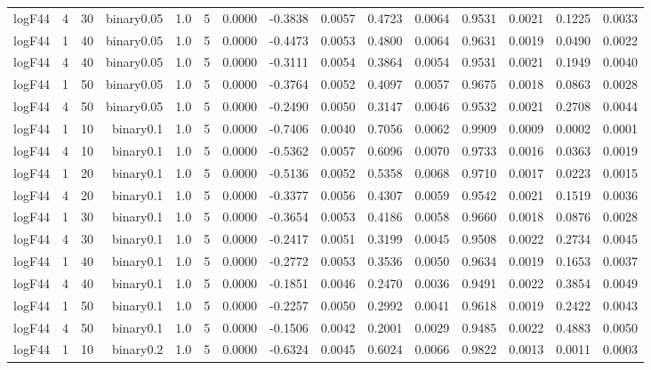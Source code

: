 \begin{longtable}{rrrrrrrrrrrrrrr}
  logF44 & 4 & 30 & binary0.05 & 1.0 & 5 & 0.0000 & -0.3838 & 0.0057 & 0.4723 & 0.0064 & 0.9531 & 0.0021 & 0.1225 & 0.0033 \\ 
  logF44 & 1 & 40 & binary0.05 & 1.0 & 5 & 0.0000 & -0.4473 & 0.0053 & 0.4800 & 0.0064 & 0.9631 & 0.0019 & 0.0490 & 0.0022 \\ 
  logF44 & 4 & 40 & binary0.05 & 1.0 & 5 & 0.0000 & -0.3111 & 0.0054 & 0.3864 & 0.0054 & 0.9531 & 0.0021 & 0.1949 & 0.0040 \\ 
  logF44 & 1 & 50 & binary0.05 & 1.0 & 5 & 0.0000 & -0.3764 & 0.0052 & 0.4097 & 0.0057 & 0.9675 & 0.0018 & 0.0863 & 0.0028 \\ 
  logF44 & 4 & 50 & binary0.05 & 1.0 & 5 & 0.0000 & -0.2490 & 0.0050 & 0.3147 & 0.0046 & 0.9532 & 0.0021 & 0.2708 & 0.0044 \\ 
  logF44 & 1 & 10 & binary0.1 & 1.0 & 5 & 0.0000 & -0.7406 & 0.0040 & 0.7056 & 0.0062 & 0.9909 & 0.0009 & 0.0002 & 0.0001 \\ 
  logF44 & 4 & 10 & binary0.1 & 1.0 & 5 & 0.0000 & -0.5362 & 0.0057 & 0.6096 & 0.0070 & 0.9733 & 0.0016 & 0.0363 & 0.0019 \\ 
  logF44 & 1 & 20 & binary0.1 & 1.0 & 5 & 0.0000 & -0.5136 & 0.0052 & 0.5358 & 0.0068 & 0.9710 & 0.0017 & 0.0223 & 0.0015 \\ 
  logF44 & 4 & 20 & binary0.1 & 1.0 & 5 & 0.0000 & -0.3377 & 0.0056 & 0.4307 & 0.0059 & 0.9542 & 0.0021 & 0.1519 & 0.0036 \\ 
  logF44 & 1 & 30 & binary0.1 & 1.0 & 5 & 0.0000 & -0.3654 & 0.0053 & 0.4186 & 0.0058 & 0.9660 & 0.0018 & 0.0876 & 0.0028 \\ 
  logF44 & 4 & 30 & binary0.1 & 1.0 & 5 & 0.0000 & -0.2417 & 0.0051 & 0.3199 & 0.0045 & 0.9508 & 0.0022 & 0.2734 & 0.0045 \\ 
  logF44 & 1 & 40 & binary0.1 & 1.0 & 5 & 0.0000 & -0.2772 & 0.0053 & 0.3536 & 0.0050 & 0.9634 & 0.0019 & 0.1653 & 0.0037 \\ 
  logF44 & 4 & 40 & binary0.1 & 1.0 & 5 & 0.0000 & -0.1851 & 0.0046 & 0.2470 & 0.0036 & 0.9491 & 0.0022 & 0.3854 & 0.0049 \\ 
  logF44 & 1 & 50 & binary0.1 & 1.0 & 5 & 0.0000 & -0.2257 & 0.0050 & 0.2992 & 0.0041 & 0.9618 & 0.0019 & 0.2422 & 0.0043 \\ 
  logF44 & 4 & 50 & binary0.1 & 1.0 & 5 & 0.0000 & -0.1506 & 0.0042 & 0.2001 & 0.0029 & 0.9485 & 0.0022 & 0.4883 & 0.0050 \\ 
  logF44 & 1 & 10 & binary0.2 & 1.0 & 5 & 0.0000 & -0.6324 & 0.0045 & 0.6024 & 0.0066 & 0.9822 & 0.0013 & 0.0011 & 0.0003 \\ 

\end{longtable}
